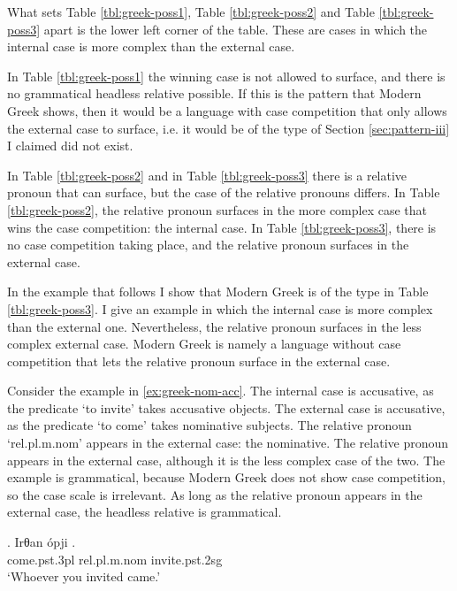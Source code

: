 What sets Table \ref{tbl:greek-poss1}, Table \ref{tbl:greek-poss2} and Table \ref{tbl:greek-poss3} apart is the lower left corner of the table. These are cases in which the internal case is more complex than the external case.

In Table \ref{tbl:greek-poss1} the winning case is not allowed to surface, and there is no grammatical headless relative possible. If this is the pattern that Modern Greek shows, then it would be a language with case competition that only allows the external case to surface, i.e. it would be of the type of Section \ref{sec:pattern-iii} I claimed did not exist.

In Table \ref{tbl:greek-poss2} and in Table \ref{tbl:greek-poss3} there is a relative pronoun that can surface, but the case of the relative pronouns differs. In Table \ref{tbl:greek-poss2}, the relative pronoun surfaces in the more complex case that wins the case competition: the internal case. In Table \ref{tbl:greek-poss3}, there is no case competition taking place, and the relative pronoun surfaces in the external case.

In the example that follows I show that Modern Greek is of the type in Table \ref{tbl:greek-poss3}. I give an example in which the internal case is more complex than the external one. Nevertheless, the relative pronoun surfaces in the less complex external case. Modern Greek is namely a language without case competition that lets the relative pronoun surface in the external case.

Consider the example in \ref{ex:greek-nom-acc}.
The internal case is accusative, as the predicate  `to invite' takes accusative objects.
The external case is accusative, as the predicate  `to come' takes nominative subjects.
The relative pronoun  `\ac{rel}.\ac{pl}.\ac{m}.\ac{nom}' appears in the external case: the nominative.
The relative pronoun appears in the external case, although it is the less complex case of the two. The example is grammatical, because Modern Greek does not show case competition, so the case scale is irrelevant. As long as the relative pronoun appears in the external case, the headless relative is grammatical.

\exg. Irθan ópji .\\
come.\ac{pst}.3\ac{pl}\scsub{[nom]} \ac{rel}.\ac{pl}.\ac{m}.\ac{nom} invite.\ac{pst}.2\ac{sg}\scsub{[acc]}\\
`Whoever you invited came.'\label{ex:greek-nom-acc}

